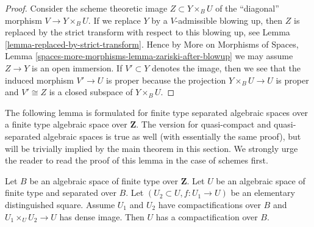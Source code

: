 \begin{proof}
Consider the scheme theoretic image $Z \subset Y \times_B U$
of the ``diagonal'' morphism $V \to Y \times_B U$. If we replace
$Y$ by a $V$-admissible blowing up, then $Z$ is replaced by
the strict transform with respect to this blowing up, see
Lemma \ref{lemma-replaced-by-strict-transform}. Hence by
More on Morphisms of Spaces, Lemma
\ref{spaces-more-morphisms-lemma-zariski-after-blowup}
we may assume $Z \to Y$
is an open immersion. If $V' \subset Y$ denotes the image, then we
see that the induced morphism $V' \to U$ is proper because the
projection $Y \times_B U \to U$ is proper and $V' \cong Z$
is a closed subspace of $Y \times_B U$.
\end{proof}

\noindent
The following lemma is formulated for finite type separated algebraic spaces
over a finite type algebraic space over $\mathbf{Z}$. The version for
quasi-compact and quasi-separated algebraic spaces is true as well (with
essentially the same proof), but will be trivially
implied by the main theorem in this section. We strongly urge the
reader to read the proof of this lemma in the case of schemes first.

\begin{lemma}
\label{lemma-two-compactifications}
Let $B$ be an algebraic space of finite type over $\mathbf{Z}$.
Let $U$ be an algebraic space of finite type and separated over $B$.
Let $(U_2 \subset U, f : U_1 \to U)$ be an
elementary distinguished square. Assume $U_1$ and $U_2$ have
compactifications over $B$ and $U_1 \times_U U_2 \to U$ has dense image.
Then $U$ has a compactification over $B$.
\end{lemma}

